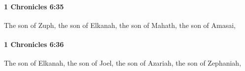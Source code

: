 		\paragraph{1 Chronicles 6:35} %
			\label{1CHRONICLES-6-35}

			The son of Zuph, the son of Elkanah, the son of Mahath, the son of Amasai,


		\paragraph{1 Chronicles 6:36} %
			\label{1CHRONICLES-6-36}

			The son of Elkanah, the son of Joel, the son of Azariah, the son of Zephaniah,


